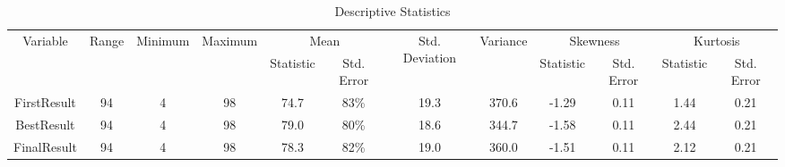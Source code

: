 \begin{landscape}
\begin{table}[htbp]
  \centering
  \caption{Descriptive Statistics}
  \label{tab:DescriptiveStatistics}%
    \begin{tabular}{c|c|c|c|c|c|c|c|c|c|c|c}
    \multirow{2}[3]{*}{Variable} & \multirow{2}[3]{*}{Range} & \multirow{2}[3]{*}{Minimum} & \multirow{2}[3]{*}{Maximum} & \multicolumn{2}{c|}{Mean} & \multirow{2}[3]{*}{Std. Deviation} & \multirow{2}[3]{*}{Variance} & \multicolumn{2}{c}{Skewness} & \multicolumn{2}{c}{Kurtosis} \bigstrut[b]\\
          &       &       &       & Statistic & Std. Error &       &       & Statistic & Std. Error & \multicolumn{1}{c|}{Statistic} & \multicolumn{1}{c}{Std. Error} \bigstrut\\
    \hline
    FirstResult & 94    & 4     & 98    & 74.7  & 83\%  & 19.3  & 370.6 & -1.29 & 0.11  & 1.44 & 0.21 \bigstrut\\
    \hline
    BestResult & 94    & 4     & 98    & 79.0  & 80\%  & 18.6  & 344.7 & -1.58 & 0.11  & 2.44 & 0.21 \bigstrut\\
    \hline
    FinalResult & 94    & 4     & 98    & 78.3  & 82\%  & 19.0  & 360.0 & -1.51 & 0.11  & 2.12 & 0.21 \bigstrut\\
    \hline
    \end{tabular}%
  \label{tab:addlabel}%
\end{table}%
%
%

\end{landscape}
